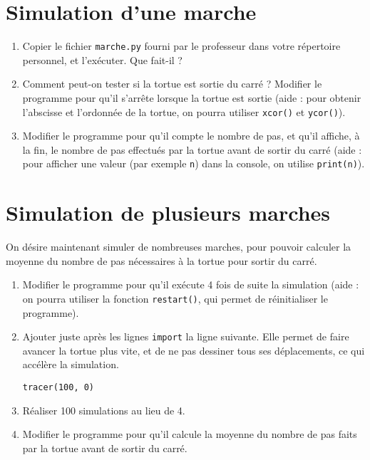 \documentclass[12pt]{article}
\begin{document}
\section{Simulation d'une marche}

\begin{enumerate}
  \item Copier le fichier \texttt{marche.py} fourni par le professeur dans
    votre répertoire personnel, et l'exécuter. Que fait-il ?
  \item Comment peut-on tester si la tortue est sortie du carré ? Modifier le
    programme pour qu'il s'arrête lorsque la tortue est sortie (aide : pour
    obtenir l'abscisse et l'ordonnée de la tortue, on pourra utiliser
    \texttt{xcor()} et \texttt{ycor()}).
  \item Modifier le programme pour qu'il compte le nombre de pas, et qu'il
    affiche, à la fin, le nombre de pas effectués par la tortue avant de
    sortir du carré (aide : pour afficher une valeur (par exemple \texttt{n})
    dans la console, on utilise \texttt{print(n)}).
\end{enumerate}

\section{Simulation de plusieurs marches}

On désire maintenant simuler de nombreuses marches, pour pouvoir calculer la
moyenne du nombre de pas nécessaires à la tortue pour sortir du carré.

\begin{enumerate}
  \item Modifier le programme pour qu'il exécute 4 fois de suite la
    simulation (aide : on pourra utiliser la fonction \texttt{restart()}, qui
    permet de réinitialiser le programme).
  \item Ajouter juste après les lignes \texttt{import} la ligne suivante.
    Elle permet de faire avancer la tortue plus vite, et de ne pas dessiner
    tous ses déplacements, ce qui accélère la simulation.

    \texttt{tracer(100, 0)}
  \item Réaliser 100 simulations au lieu de 4.
  \item Modifier le programme pour qu'il calcule la moyenne du nombre de pas
    faits par la tortue avant de sortir du carré.
\end{enumerate}
\end{document}
